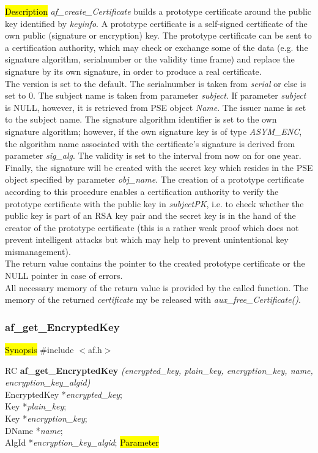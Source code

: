 \hl{Description}
{\em af\_create\_Certificate} builds a prototype certificate around the
public key identified by {\em keyinfo}. A prototype certificate is a self-signed
certificate of the own public (signature or encryption) key. The 
prototype certificate can be sent to a certification authority, which may check
or exchange some of the data (e.g. the signature algorithm, serialnumber or the validity time frame)
and replace the signature by its own signature, in order to produce a real certificate.
\\ [1em]
The version is set to the default. The serialnumber is taken from {\em serial} or else is set to $0$.
The subject name is taken from parameter {\em subject}. If parameter {\em subject} is NULL, however, it is 
retrieved from PSE object {\em Name}. The issuer name is set to the subject name.
The signature algorithm identifier is set to the
own signature algorithm; however, if the own signature 
key is of type {\em ASYM\_ENC}, the algorithm name associated with the certificate's signature is derived
from parameter {\em sig\_alg}. The validity is set to the interval
from now on for one year. Finally, the signature will be created
with the secret key which resides in the PSE object specified by parameter {\em obj\_name}.
The creation of a prototype certificate according to this procedure enables a
certification authority to verify the prototype certificate with
the public key in {\em subjectPK}, i.e. to check whether the public
key is part of an RSA key pair and the secret key is in the hand of the
creator of the prototype certificate (this is a rather weak proof
which does not prevent intelligent attacks but which may help to prevent
unintentional key mismanagement).
\\ [1em]
The return value contains the pointer to the created prototype certificate or
the NULL pointer in case of errors.
\\ [1em]
All necessary memory of the return value is provided by the called function.
The memory of the returned {\em certificate} my be released with 
{\em aux\_free\_Certificate()}.


\subsubsection{af\_get\_EncryptedKey}
\label{af_get_EncryptedKey}
\hl{Synopsis}
\#include $<$af.h$>$

RC {\bf af\_get\_EncryptedKey} {\em (encrypted\_key, plain\_key, encryption\_key, name, encryption\_key\_algid)} \\
EncryptedKey *{\em encrypted\_key}; \\
Key *{\em plain\_key}; \\
Key *{\em encryption\_key}; \\
DName *{\em name}; \\
AlgId *{\em encryption\_key\_algid};
\hl{Parameter}

